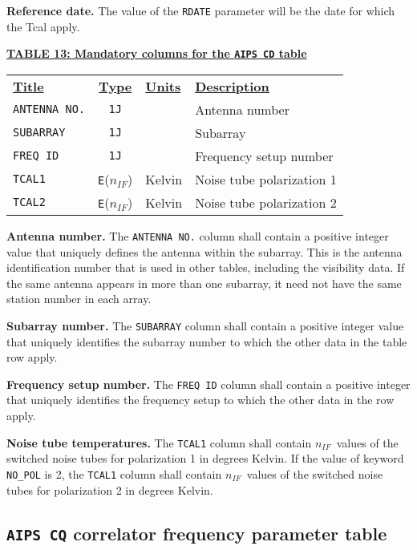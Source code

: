 \documentclass[twoside]{article}
\newcommand{\nif}{$n_{IF}$}
\begin{document}
{\bf Reference date.} The value of the {\tt RDATE} parameter will be
the date for which the Tcal apply.

\begin{center}
\underline{\bf{TABLE 13: Mandatory columns for the {\tt AIPS CD} table}}\\
\begin{tabular}{lcll}
\noalign{\vspace{2pt}} \label{ta:CDcols}
\underline{{\bf Title\vphantom{y}}} & \underline{\bf{Type}} &
   \underline{{\bf Units\vphantom{y}}} & \underline{\bf{Description}} \\
\noalign{\vspace{2pt}}
{\tt ANTENNA NO.} & {\tt 1J} &  & Antenna number \\
{\tt SUBARRAY}    & {\tt 1J} &  & Subarray \\
{\tt FREQ ID}     & {\tt 1J} &  & Frequency setup number \\
{\tt TCAL1}       & {\tt E}(\nif) & Kelvin & Noise tube polarization 1 \\
\hline
{\tt TCAL2}       & {\tt E}(\nif) & Kelvin & Noise tube polarization 2
\end{tabular}
\end{center}

{\bf Antenna number.} The {\tt ANTENNA NO.} column shall contain a
positive integer value that uniquely defines the antenna within the
subarray.  This is the antenna identification number that is used in
other tables, including the visibility data. If the same antenna
appears in more than one subarray, it need not have the same station
number in each array.

{\bf Subarray number.} The {\tt SUBARRAY} column shall contain a
positive integer value that uniquely identifies the subarray number
to which the other data in the table row apply.

{\bf Frequency setup number.} The {\tt FREQ ID} column shall contain a
positive integer that uniquely identifies the frequency setup to which
the other data in the row apply.

{\bf Noise tube temperatures.} The {\tt TCAL1} column shall contain
\nif\ values of the switched noise tubes for polarization 1 in degrees
Kelvin.  If the value of keyword {\tt NO\_POL} is 2, the {\tt TCAL1}
column shall contain \nif\ values of the switched noise tubes for
polarization 2 in degrees Kelvin.

\subsection{{\tt AIPS CQ} correlator frequency parameter table}
\label{s:CQ}
\end{document}
